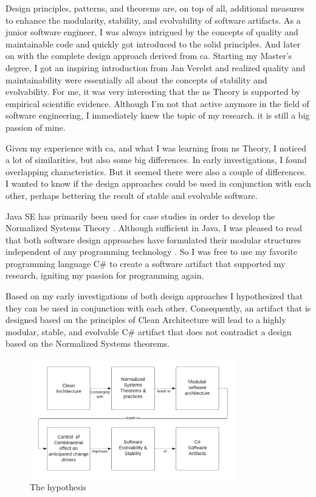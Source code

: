 Design principles, patterns, and theorems are, on top of all, additional measures to
enhance the modularity, stability, and evolvability of software artifacts. As a junior
software engineer, I was always intrigued by the concepts of quality and maintainable code
and quickly got introduced to the \gls{solid} principles. And later on with the complete
design approach derived from \gls{ca}. Starting my Master's degree, I got an
inspiring introduction from Jan Verelst and realized quality and maintainability were
essentially all about the concepts of stability and evolvability. For me, it was very
interesting that the \gls{ns} Theory is supported by empirical scientific evidence.
Although I'm not that active anymore in the field of software engineering, I immediately
knew the topic of my research. it is still a big passion of mine.

Given my experience with \gls{ca}, and what I was learning from \gls{ns} Theory, I noticed
a lot of similarities, but also some big differences. In early investigations, I found
overlapping characteristics. But it seemed there were also a couple of differences. I
wanted to know if the design approaches could be used in conjunction with each other,
perhaps bettering the result of stable and evolvable software.

Java SE has primarily been used for case studies in order to develop the Normalized
Systems Theory \parencite{oorts_building_2014, de_bruyn_enabling_2018}. Although
sufficient in Java, I was pleased to read that both software design approaches have
formulated their modular structures independent of any programming technology
\parencite{mannaert_normalized_2009,robert_c_martin_clean_2018}. So I was free to use my
favorite programming language C\# to create a software artifact that supported my
research, igniting my passion for programming again. 

Based on my early investigations of both design approaches I hypothesized that they can be
used in conjunction with each other. Consequently, an artifact that is designed based on
the principles of Clean Architecture will lead to a highly modular, stable, and evolvable
C\# artifact that does not contradict a design based on the Normalized Systems theorems.

\begin{figure}[H]
    \centering
    \includegraphics[width=0.8\textwidth]{Figures/hypothesis.pdf}
    \caption[The hypothesis]{The hypothesis}
    \label{fig_hypothesis}
\end{figure}

